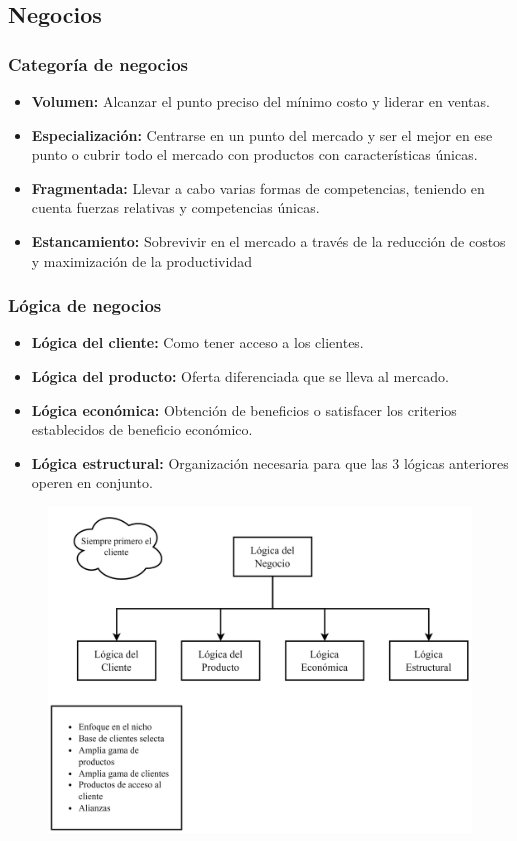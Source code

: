 \documentclass{templateNote}
\begin{document}
\newpage
\subsection{Negocios}
\subsubsection{Categoría de negocios}
\begin{itemize}
    \item \textbf{Volumen:} Alcanzar el punto preciso del mínimo costo y liderar en ventas.
    \item \textbf{Especialización:} Centrarse en un punto del mercado y ser el mejor en ese punto o cubrir todo el mercado con productos con características únicas.
    \item \textbf{Fragmentada:} Llevar a cabo varias formas de competencias, teniendo en cuenta fuerzas relativas y competencias únicas.
    \item \textbf{Estancamiento:} Sobrevivir en el mercado a través de la reducción de costos y maximización de la productividad
\end{itemize}

\subsubsection{Lógica de negocios}
\begin{itemize}
    \item \textbf{Lógica del cliente:} Como tener acceso a los clientes.
    \item \textbf{Lógica del producto:} Oferta diferenciada que se lleva al mercado.
    \item \textbf{Lógica económica:} Obtención de beneficios o satisfacer los criterios establecidos de beneficio económico.
    \item \textbf{Lógica estructural:} Organización necesaria para que las 3 lógicas anteriores operen en conjunto.
\end{itemize}

\begin{figure}[H]
    \centering
    \includegraphics[width=\textwidth]{img/Logicas.png}
\end{figure}
\end{document}
